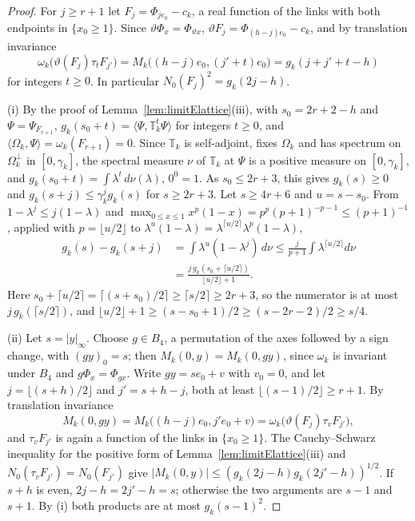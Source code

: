 \documentclass[aps,prd,twocolumn,superscriptaddress,nofootinbib,longbibliography,floatfix,amsmath,amssymb,10pt]{revtex4-2}
\theoremstyle{definition}
\theoremstyle{remark}
\newcommand{\ip}[2]{\langle #1,#2\rangle}
\begin{document}
\begin{proof}
For $j\ge r+1$ let $F_j=\Phi_{je_0}-c_k$, a real function of the links with
both endpoints in $\{x_0\ge1\}$. Since $\vartheta\Phi_x=\Phi_{\vartheta x}$,
$\vartheta F_j=\Phi_{(h-j)e_0}-c_k$, and by translation invariance
\[
\omega_k\bigl(\vartheta(F_j)\tau_tF_{j'}\bigr)=M_k\bigl((h-j)e_0,(j'+t)e_0
\bigr)=g_k(j+j'+t-h)
\]
for integers $t\ge0$. In particular $N_0(F_j)^2=g_k(2j-h)$.

(i) By the proof of Lemma~\ref{lem:limitElattice}(iii), with $s_0=2r+2-h$
and $\Psi=\Psi_{F_{r+1}}$, $g_k(s_0+t)=\ip\Psi{\mathbb T_k^t\Psi}$ for
integers $t\ge0$, and $\ip{\Omega_k}\Psi=\omega_k(F_{r+1})=0$. Since
$\mathbb T_k$ is self-adjoint, fixes $\Omega_k$ and has spectrum on
$\Omega_k^\perp$ in $[0,\gamma_k]$, the spectral measure $\nu$ of
$\mathbb T_k$ at $\Psi$ is a positive measure on $[0,\gamma_k]$, and
$g_k(s_0+t)=\int\lambda^t\,d\nu(\lambda)$, $0^0=1$. As $s_0\le2r+3$, this
gives $g_k(s)\ge0$ and $g_k(s+j)\le\gamma_k^jg_k(s)$ for $s\ge2r+3$. Let
$s\ge4r+6$ and $u=s-s_0$. From $1-\lambda^j\le j(1-\lambda)$ and $\max_{0\le
x\le1}x^p(1-x)=p^p(p+1)^{-p-1}\le(p+1)^{-1}$, applied with $p=\lfloor u/2
\rfloor$ to $\lambda^u(1-\lambda)=\lambda^{\lceil u/2\rceil}\lambda^p(1-
\lambda)$,
\[
\begin{split}
g_k(s)-g_k(s+j)&=\int\lambda^u(1-\lambda^j)\,d\nu\le\frac j{p+1}
\int\lambda^{\lceil u/2\rceil}d\nu\\
&=\frac{j\,g_k(s_0+\lceil u/2\rceil)}{\lfloor u/2\rfloor+1} .
\end{split}
\]
Here $s_0+\lceil u/2\rceil=\lceil(s+s_0)/2\rceil\ge\lceil s/2\rceil\ge2r+3$,
so the numerator is at most $j\,g_k(\lceil s/2\rceil)$, and $\lfloor u/2
\rfloor+1\ge(s-s_0+1)/2\ge(s-2r-2)/2\ge s/4$.

(ii) Let $s=|y|_\infty$. Choose $g\in B_4$, a permutation of the axes
followed by a sign change, with $(gy)_0=s$; then $M_k(0,y)=M_k(0,gy)$, since
$\omega_k$ is invariant under $B_4$ and $g\Phi_x=\Phi_{gx}$. Write
$gy=se_0+v$ with $v_0=0$, and let $j=\lfloor(s+h)/2\rfloor$ and $j'=s+h-j$,
both at least $\lfloor(s-1)/2\rfloor\ge r+1$. By translation invariance
\[
M_k(0,gy)=M_k\bigl((h-j)e_0,j'e_0+v\bigr)=\omega_k\bigl(\vartheta(F_j)
\tau_vF_{j'}\bigr),
\]
and $\tau_vF_{j'}$ is again a function of the links in $\{x_0\ge1\}$. The
Cauchy--Schwarz inequality for the positive form of
Lemma~\ref{lem:limitElattice}(iii) and $N_0(\tau_vF_{j'})=N_0(F_{j'})$ give
$|M_k(0,y)|\le(g_k(2j-h)g_k(2j'-h))^{1/2}$. If $s+h$ is even, $2j-h=2j'-h=
s$; otherwise the two arguments are $s-1$ and $s+1$. By (i) both products
are at most $g_k(s-1)^2$.


\end{proof}
\end{document}
